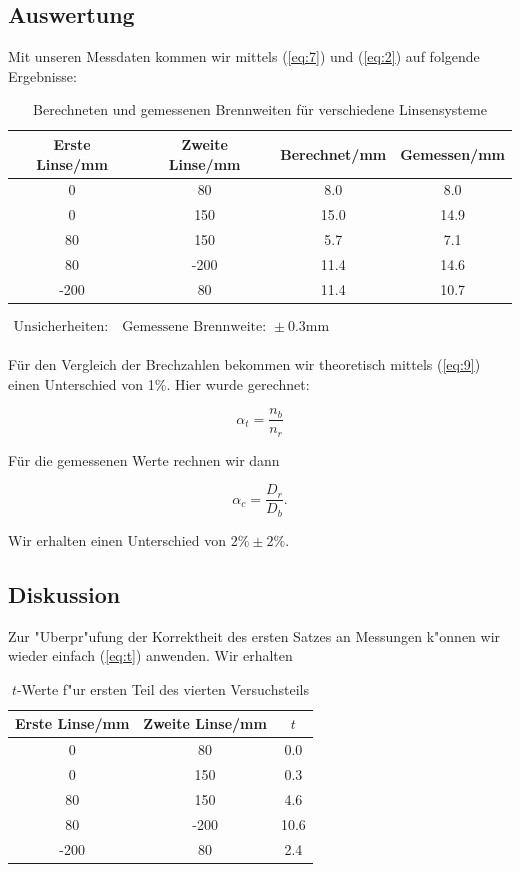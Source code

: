 \documentclass[11pt,a4paper]{article}
\begin{document}
\pagebreak

\subsection{Auswertung}

Mit unseren Messdaten kommen wir mittels (\ref{eq:7}) und (\ref{eq:2}) auf folgende Ergebnisse:

\begin{table}[h]
\centering
\caption{Berechneten und gemessenen Brennweiten f\"ur verschiedene Linsensysteme} \vspace{11pt}
\begin{tabular}{cccc}
\toprule
\textrm{Erste Linse}/\textrm{mm} & \textrm{Zweite Linse}/\textrm{mm} & \textrm{Berechnet}/\textrm{mm} & \textrm{Gemessen}/\textrm{mm} \\
\midrule 
0 & 80 & 8.0 & 8.0 \\
0 & 150 & 15.0 & 14.9 \\
80 & 150 & 5.7 & 7.1 \\
80 & -200 & 11.4 & 14.6 \\
-200 & 80 & 11.4 & 10.7 \\
\bottomrule
\end{tabular}
$\begin{array}{l}
\textrm{Unsicherheiten:}\quad
\textrm{Gemessene Brennweite: } \pm 0.3 \textrm{mm}\\
\end{array}$
\label{Tab:X}
\end{table}

F\"ur den Vergleich der Brechzahlen bekommen wir theoretisch mittels (\ref{eq:9}) einen Unterschied von 1\%. Hier wurde gerechnet:

\[
\alpha_t=\frac{n_b}{n_r}
\]

F\"ur die gemessenen Werte rechnen wir dann

\[\alpha_c=\frac{D_r}{D_b}.\]

Wir erhalten einen Unterschied von $2\%\pm2\%$.

\subsection{Diskussion}

Zur "Uberpr"ufung der Korrektheit des ersten Satzes an Messungen k"onnen wir wieder einfach (\ref{eq:t}) anwenden. Wir erhalten

\begin{table}[h]
\centering
\caption{$t$-Werte f"ur ersten Teil des vierten Versuchsteils} \vspace{11pt}
\begin{tabular}{ccc}
\toprule
\textrm{Erste Linse}/\textrm{mm} & \textrm{Zweite Linse}/\textrm{mm} & $t$ \\
\midrule 
0 & 80 & 0.0 \\
0 & 150 & 0.3 \\
80 & 150 & 4.6 \\
80 & -200 & 10.6 \\
-200 & 80 & 2.4 \\
\bottomrule
\end{tabular}
\label{Tab:X}
\end{table}
\end{document}
